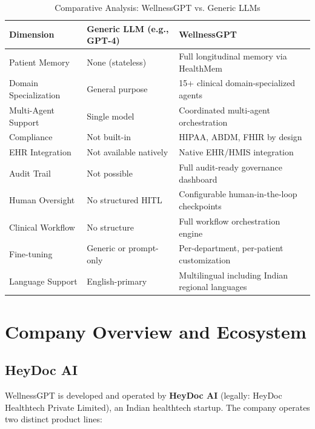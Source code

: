 \documentclass[12pt,a4paper]{article}
\begin{document}
\begin{table}[H]
\centering
\renewcommand{\arraystretch}{1.5}
\begin{tabularx}{\textwidth}{lXX}
\toprule
\textbf{Dimension} & \textbf{Generic LLM (e.g., GPT-4)} & \textbf{WellnessGPT} \\
\midrule
Patient Memory        & None (stateless)              & Full longitudinal memory via HealthMem \\
Domain Specialization & General purpose               & 15+ clinical domain-specialized agents \\
Multi-Agent Support   & Single model                  & Coordinated multi-agent orchestration \\
Compliance            & Not built-in                  & HIPAA, ABDM, FHIR by design \\
EHR Integration       & Not available natively        & Native EHR/HMIS integration \\
Audit Trail           & Not possible                  & Full audit-ready governance dashboard \\
Human Oversight       & No structured HITL            & Configurable human-in-the-loop checkpoints \\
Clinical Workflow     & No structure                  & Full workflow orchestration engine \\
Fine-tuning           & Generic or prompt-only        & Per-department, per-patient customization \\
Language Support      & English-primary               & Multilingual including Indian regional languages \\
\bottomrule
\end{tabularx}
\caption{Comparative Analysis: WellnessGPT vs. Generic LLMs}
\end{table}

\newpage

\section{Company Overview and Ecosystem}

\subsection{HeyDoc AI}

WellnessGPT is developed and operated by \textbf{HeyDoc AI} (legally: HeyDoc Healthtech Private Limited), an Indian healthtech startup. The company operates two distinct product lines:
\end{document}
